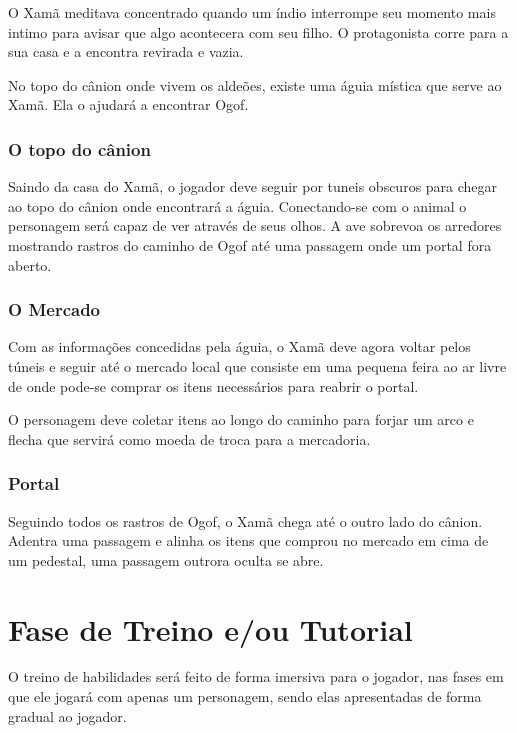 O Xamã meditava concentrado quando um índio interrompe seu momento mais intimo para avisar que algo acontecera com seu filho. O protagonista corre para a sua casa e a encontra revirada e vazia.

No topo do cânion onde vivem os aldeões, existe uma águia mística que serve ao Xamã. Ela o ajudará a encontrar Ogof.

\subsubsection{O topo do cânion}
Saindo da casa do Xamã, o jogador deve seguir por tuneis obscuros para chegar ao topo do cânion onde encontrará a águia. Conectando-se com o animal o personagem será capaz de ver através de seus olhos. A ave sobrevoa os arredores mostrando rastros do caminho de Ogof até uma passagem onde um portal fora aberto.

\subsubsection{O Mercado}
Com as informações concedidas pela águia, o Xamã deve agora voltar pelos túneis e seguir até o mercado local que consiste em uma pequena feira ao ar livre de onde pode-se comprar os itens necessários para reabrir o portal.

O personagem deve coletar itens ao longo do caminho para forjar um arco e flecha que servirá como moeda de troca para a mercadoria.

\subsubsection{Portal}
Seguindo todos os rastros de Ogof, o Xamã chega até o outro lado do cânion. Adentra uma passagem e alinha os itens que comprou no mercado em cima de um pedestal, uma passagem outrora oculta se abre.

\section{Fase de Treino e/ou Tutorial}

O treino de habilidades será feito de forma imersiva para o jogador, nas fases em que ele jogará com apenas um personagem, sendo elas apresentadas de forma gradual ao jogador.
